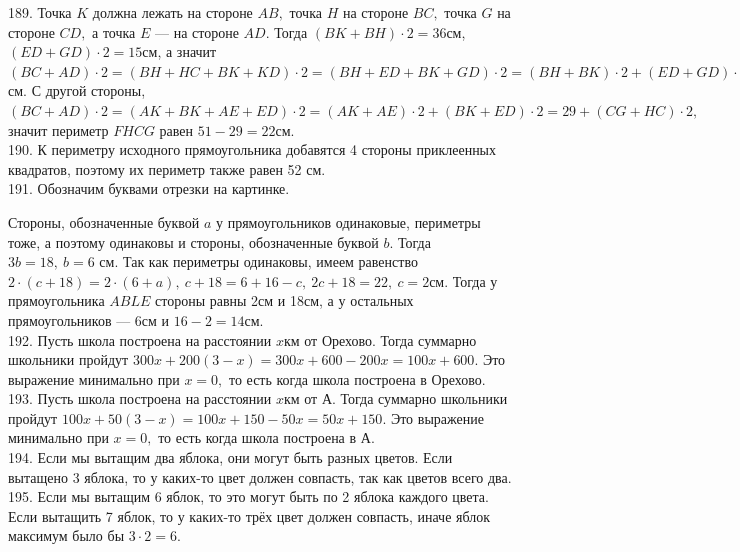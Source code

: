 \documentclass[12pt]{article}
\begin{document}
189. Точка $K$ должна лежать на стороне $AB,$ точка $H$ на стороне $BC,$ точка $G$ на стороне $CD,$ а точка $E$ --- на стороне $AD.$ Тогда $(BK+BH)\cdot2=36$см, $(ED+GD)\cdot2=15$см, а значит $(BC+AD)\cdot2=(BH+HC+BK+KD)\cdot2=(BH+ED+BK+GD)\cdot2=(BH+BK)\cdot2+(ED+GD)\cdot2=36+15=51$см. С другой стороны, $(BC+AD)\cdot2=(AK+BK+AE+ED)\cdot2=(AK+AE)\cdot2+(BK+ED)\cdot2=29+(CG+HC)\cdot2,$ значит периметр $FHCG$ равен $51-29=22$см.\\
190. К периметру исходного прямоугольника добавятся 4 стороны приклеенных квадратов, поэтому их периметр также равен 52 см.\\
191. Обозначим буквами отрезки на картинке.
\begin{center}
\begin{figure}[ht!]
\end{figure}
\end{center}
Стороны, обозначенные буквой $a$ у прямоугольников одинаковые, периметры тоже, а поэтому одинаковы и стороны, обозначенные буквой $b.$ Тогда $3b=18,\ b=6$ см. Так как периметры одинаковы, имеем равенство $2\cdot(c+18)=2\cdot(6+a),\ c+18=6+16-c,\ 2c+18=22,\ c=2$см. Тогда у прямоугольника $ABLE$ стороны равны 2см и 18см, а у остальных прямоугольников --- 6см и $16-2=14$см.\\
192. Пусть школа построена на расстоянии $x$км от Орехово. Тогда суммарно школьники пройдут $300x+200(3-x)=300x+600-200x=100x+600.$ Это выражение минимально при $x=0,$ то есть когда школа построена в Орехово.\\
193. Пусть школа построена на расстоянии $x$км от А. Тогда суммарно школьники пройдут $100x+50(3-x)=100x+150-50x=50x+150.$ Это выражение минимально при $x=0,$ то есть когда школа построена в А.\\
194. Если мы вытащим два яблока, они могут быть разных цветов. Если вытащено 3 яблока, то у каких-то цвет должен совпасть, так как цветов всего два.\\
195. Если мы вытащим 6 яблок, то это могут быть по 2 яблока каждого цвета. Если вытащить 7 яблок, то у каких-то трёх цвет должен совпасть, иначе яблок максимум было бы $3\cdot2=6.$
\end{document}
